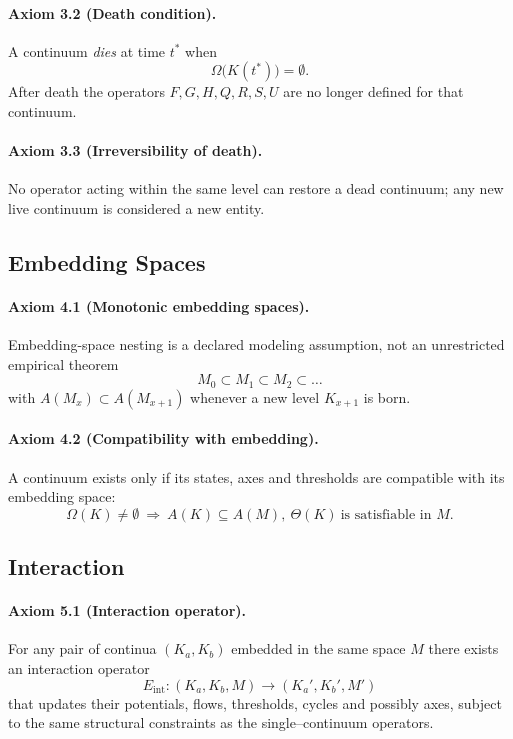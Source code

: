 \paragraph{Axiom 3.2 (Death condition).}
A continuum \emph{dies} at time \(t^{\ast}\) when
\[
  \Omega\big(K(t^{\ast})\big) = \emptyset.
\]
After death the operators \(F,G,H,Q,R,S,U\) are no longer defined for that
continuum.

\paragraph{Axiom 3.3 (Irreversibility of death).}
No operator acting within the same level can restore a dead continuum; any new
live continuum is considered a new entity.

\subsection{Embedding Spaces}

\paragraph{Axiom 4.1 (Monotonic embedding spaces).}
Embedding-space nesting is a declared modeling assumption, not an unrestricted empirical theorem
\[
  M_0 \subset M_1 \subset M_2 \subset \dots
\]
with
\(A(M_x)\subset A(M_{x+1})\) whenever a new level \(K_{x+1}\) is born.

\paragraph{Axiom 4.2 (Compatibility with embedding).}
A continuum exists only if its states, axes and thresholds are compatible with
its embedding space:
\[
  \Omega(K)\neq\emptyset
  \ \Longrightarrow\
  A(K)\subseteq A(M),\
  \Theta(K) \ \text{is satisfiable in } M.
\]

\subsection{Interaction}

\paragraph{Axiom 5.1 (Interaction operator).}
For any pair of continua \((K_a,K_b)\) embedded in the same space \(M\) there
exists an interaction operator
\[
  E_{\mathrm{int}} : (K_a,K_b,M) \to (K_a',K_b',M')
\]
that updates their potentials, flows, thresholds, cycles and possibly axes,
subject to the same structural constraints as the single--continuum operators.


